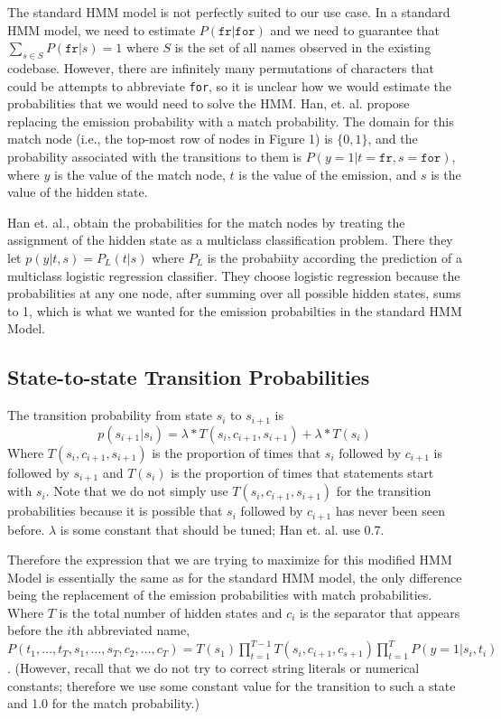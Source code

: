 \documentclass[10pt]{article}
\begin{document}
The standard HMM model is not perfectly suited to our use case. In a standard HMM model, we need to estimate $P(\texttt{fr} | \texttt{for})$ and we need to guarantee that $\sum_{s \in S} P(\texttt{fr}|s)=1$ where $S$ is the set of all names observed in the existing codebase. However, there are infinitely many permutations of characters that could be attempts to abbreviate \texttt{for}, so it is unclear how we would estimate the probabilities that we would need to solve the HMM. Han, et. al. propose replacing the emission probability with a match probability. The domain for this match node (i.e., the top-most row of nodes in Figure 1) is $\{0,1\}$, and the probability associated with the transitions to them is $P(y=1 | t=\texttt{fr}, s=\texttt{for})$, where $y$ is the value of the match node, $t$ is the value of the emission, and $s$ is the value of the hidden state.

Han et. al.,  obtain the probabilities for the match nodes by treating the assignment of the hidden state as a multiclass classification problem. There they let $ p(y | t, s)=P_L(t|s)$ where $P_L$ is the probabiity according the prediction of a multiclass logistic regression classifier. They choose logistic regression because the probabilities at any one node, after summing over all possible hidden states, sums to 1, which is what we wanted for the emission probabilties in the standard HMM Model. 

\subsection{State-to-state Transition Probabilities}

The transition probability from state $s_i$ to $s_{i+1}$ is
\[
	p(s_{i+1} | s_i) = \lambda*T(s_i,c_{i+1},s_{i+1}) + \lambda*T(s_i)
\]
Where $T(s_i,c_{i+1},s_{i+1})$ is the proportion of times that $s_i$ followed by $c_{i+1}$ is followed by $s_{i+1}$ and $T(s_i)$ is the proportion of times that statements start with $s_i$. Note that we do not simply use $T(s_i,c_{i+1},s_{i+1})$ for the transition probabilities because it is possible that $s_i$ followed by $c_{i+1}$ has never been seen before. $\lambda$ is some constant that should be tuned; Han et. al. use 0.7. 

Therefore the expression that we are trying to maximize for this modified HMM Model is essentially the same as for the standard HMM model, the only difference being the replacement of the emission probabilities with match probabilities. Where $T$ is the total number of hidden states and $c_i$ is the separator that appears before the $i$th abbreviated name, $P(t_1,\ldots, t_T, s_1,\ldots,s_T, c_2,\ldots,c_T)=T(s_1)\prod_{t=1}^{T-1} T(s_i,c_{i+1}, c_{s+1})\prod_{t=1}^{T}P(y=1|s_i,t_i)$. (However, recall that we do not try to correct string literals or numerical constants; therefore we use some constant value for the transition to such a state and 1.0 for the match probability.)
\end{document}
